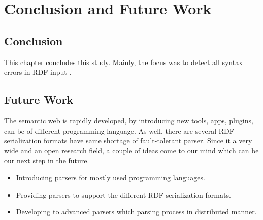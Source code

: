 \chapter{Conclusion and Future Work}
\label{ch:conclusions}
\section{Conclusion}
This chapter concludes this study. Mainly, the focus was to detect all syntax errors in RDF input .  

\section{ Future Work}
The semantic web is rapidly developed, by introducing new tools, apps, plugins, can be of different programming language. As well, there are several RDF serialization  formats have same shortage of fault-tolerant parser. Since it a very wide and an open research field, a couple of ideas come to our mind which can be our next step in the future. 
\begin{itemize}
    \item Introducing parsers for mostly used programming languages. 
    \item Providing parsers to support the different RDF serialization formats.
    \item Developing to advanced parsers which parsing process in distributed manner.
\end{itemize}

